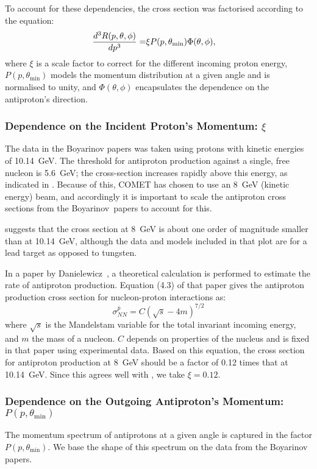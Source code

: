 To account for these dependencies, the cross section was factorised according to the equation:
\begin{align}
\eqlabel{bg:antiprotons:factorisation}
	\frac{d^3R(p,\theta,\phi)}{dp^3}=&\xi{}P(p,\theta_\mathrm{min})\Phi(\theta,\phi),
\end{align}
where $\xi$ is a scale factor to correct for the different incoming proton energy, $P(p,\theta_\textrm{min})$ models the momentum distribution at a given angle and is normalised to unity, and $\Phi(\theta,\phi)$ encapsulates the dependence on the antiproton's direction.

\subsubsection*{Dependence on the Incident Proton's Momentum: $\xi$}
The data in the Boyarinov papers was taken using protons with kinetic energies of 10.14~GeV.
The threshold for antiproton production against a single, free nucleon is 5.6~GeV; the cross-section increases rapidly above this energy, as indicated in .
Because of this, COMET has chosen to use an 8~GeV (kinetic energy) beam, and accordingly it is important to scale the antiproton cross sections from the Boyarinov~\etal papers to account for this.

 suggests that the cross section at 8~GeV is about one order of magnitude smaller than at 10.14~GeV, although the data and models included in that plot are for a lead target as opposed to tungsten.

In a paper by Danielewicz~\cite{PhysRevC.42.1564}, a theoretical calculation is performed to estimate the rate of antiproton production.
Equation (4.3) of that paper gives the antiproton production cross section for nucleon-proton interactions as:
\begin{equation}
\sigma_{NN}^{\bar{p}}=C(\sqrt{s}-4m)^{7/2}
\end{equation}
where $\sqrt{s}$ is the Mandelstam variable for the total invariant incoming energy, and $m$ the mass of a nucleon.
$C$ depends on properties of the nucleus and is fixed in that paper using experimental data.
Based on this equation, the cross section for antiproton production at 8~GeV should be a factor of 0.12 times that at 10.14~GeV.
Since this agrees well with , we take $\xi=0.12$.

\subsubsection*{Dependence on the Outgoing Antiproton's Momentum: $P(p,\theta_\textrm{min})$}
The momentum spectrum of antiprotons at a given angle is captured in the factor $P(p,\theta_\textrm{min})$.
We base the shape of this spectrum on the data from the Boyarinov papers.

